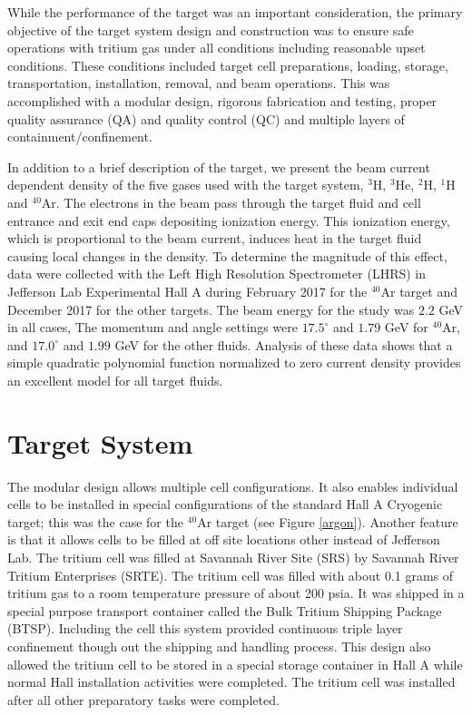 \documentclass[final,5p,times,twocolumn]{elsarticle}
\begin{document}
While the performance of the target was an important consideration, the primary objective of the target system design and construction was to ensure safe operations with tritium gas under all conditions including reasonable upset conditions. These conditions included target cell preparations, loading, storage, transportation, installation, removal, and beam operations. This was accomplished with a modular design, rigorous fabrication and testing, proper quality assurance (QA) and quality control (QC) and multiple layers of containment/confinement. 
 
In addition to a brief description of the target, we present the beam current dependent density of the five gases used 
with the target system, $^{3}$H, $^{3}$He, $^{2}$H, $^{1}$H and $^{40}$Ar. The electrons in the beam pass through the target fluid and cell entrance and exit end caps depositing ionization energy. This ionization energy, which is proportional to the beam current, induces heat in the target fluid causing local changes in the density. To determine the magnitude of this effect, data were collected with the Left High Resolution Spectrometer (LHRS) in Jefferson Lab Experimental Hall A during February 2017 for the $^{40}$Ar target and December 2017 for the other targets. The beam energy for the study was $2.2$ GeV in all cases, The momentum and angle settings were $17.5 ^\circ $ and $1.79$ GeV for $^{40}$Ar, and $17.0 ^\circ $ and $1.99$ GeV for the other fluids. Analysis of these data shows that a simple quadratic polynomial function normalized to zero current density provides an excellent model for all target fluids.


\section{Target System}

The modular design allows multiple cell configurations. It also enables individual cells to be installed in special configurations of the standard Hall A Cryogenic target; this was the case for the $^{40}$Ar target (see Figure \ref{argon}). Another feature is that it allows cells to be filled at off site locations other instead of Jefferson Lab. The tritium cell was filled at Savannah River Site (SRS) by Savannah River Tritium Enterprises (SRTE). The tritium cell was filled with about 0.1 grams of tritium gas to a room temperature pressure of about 200 psia. It was shipped in a special purpose transport container called the Bulk Tritium Shipping Package (BTSP). Including the cell this system provided continuous triple layer confinement though out the shipping and handling process. This design also allowed the tritium cell to be stored in a special storage container in Hall A while normal Hall installation activities were completed. The tritium cell was installed after all other preparatory tasks were completed.
\end{document}
